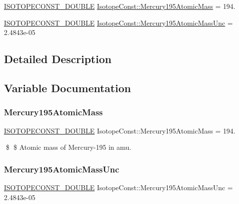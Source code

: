 \begin{DoxyCompactItemize}
\item 
\mbox{\hyperlink{group___isotope_const-_macros_ga8f45a7272ce02c0b4c65c44636ed719a}{I\+S\+O\+T\+O\+P\+E\+C\+O\+N\+S\+T\+\_\+\+D\+O\+U\+B\+LE}} \mbox{\hyperlink{group___isotope_const-_mercury-_hg195_ga127673e3716a65fcf987b197e1d00745}{Isotope\+Const\+::\+Mercury195\+Atomic\+Mass}} = 194.
\item 
\mbox{\hyperlink{group___isotope_const-_macros_ga8f45a7272ce02c0b4c65c44636ed719a}{I\+S\+O\+T\+O\+P\+E\+C\+O\+N\+S\+T\+\_\+\+D\+O\+U\+B\+LE}} \mbox{\hyperlink{group___isotope_const-_mercury-_hg195_ga8ebbcd48a950013a1fd19c44f7f5d07c}{Isotope\+Const\+::\+Mercury195\+Atomic\+Mass\+Unc}} = 2.\+4843e-\/05
\end{DoxyCompactItemize}


\subsection{Detailed Description}


\subsection{Variable Documentation}
\mbox{\label{group___isotope_const-_mercury-_hg195_ga127673e3716a65fcf987b197e1d00745}} 
\subsubsection{\texorpdfstring{Mercury195\+Atomic\+Mass}{Mercury195AtomicMass}}
{\footnotesize\ttfamily \mbox{\hyperlink{group___isotope_const-_macros_ga8f45a7272ce02c0b4c65c44636ed719a}{I\+S\+O\+T\+O\+P\+E\+C\+O\+N\+S\+T\+\_\+\+D\+O\+U\+B\+LE}} Isotope\+Const\+::\+Mercury195\+Atomic\+Mass = 194.}

\$ \$ Atomic mass of Mercury-\/195 in amu. \mbox{\label{group___isotope_const-_mercury-_hg195_ga8ebbcd48a950013a1fd19c44f7f5d07c}} 
\subsubsection{\texorpdfstring{Mercury195\+Atomic\+Mass\+Unc}{Mercury195AtomicMassUnc}}
{\footnotesize\ttfamily \mbox{\hyperlink{group___isotope_const-_macros_ga8f45a7272ce02c0b4c65c44636ed719a}{I\+S\+O\+T\+O\+P\+E\+C\+O\+N\+S\+T\+\_\+\+D\+O\+U\+B\+LE}} Isotope\+Const\+::\+Mercury195\+Atomic\+Mass\+Unc = 2.\+4843e-\/05}

